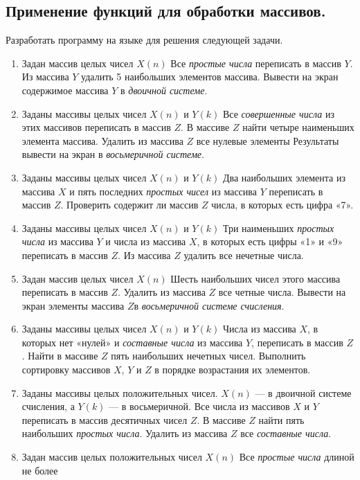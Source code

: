 \subsection[Применение функций для обработки массивов.]{Применение функций для обработки массивов.}
Разработать программу на языке  для решения следующей задачи.

\begin{enumerate}
\item Задан массив целых чисел $X(n)$ Все \emph{простые числа} переписать в массив
$Y$. Из массива $Y$ удалить 5 наибольших элементов массива. Вывести на экран содержимое массива
$Y$ в \emph{двоичной системе}.
\item Заданы массивы целых чисел $X(n)$ и $Y(k)$ Все
\emph{совершенные числа} из этих массивов переписать в массив $Z$. В массиве
$Z$ найти четыре наименьших элемента массива. Удалить из массива $Z$ все нулевые
элементы Результаты вывести на экран в \emph{восьмеричной системе}. 
\item Заданы массивы целых чисел $X(n)$ и $Y(k)$ Два наибольших
элемента из массива $X$ и пять последних \emph{простых чисел} из массива
$Y$ переписать в массив $Z$. Проверить содержит ли массив $Z$ числа, в
которых есть цифра «7».
\item Заданы массивы целых чисел $X(n)$ и $Y(k)$ Три наименьших
\emph{простых числа} из массива $Y$ и числа из массива $X$, в которых есть цифры «1»
и «9» переписать в массив $Z$. Из  массива $Z$ удалить все нечетные числа.
\item Задан массив целых чисел $X(n)$ Шесть наибольших чисел этого массива переписать в массив
$Z$. Удалить из массива $Z$ все четные числа. Вывести на экран элементы массива
$Z$$ $в \emph{восьмеричной системе счисления}.
\item Заданы массивы целых чисел $X(n)$ и $Y(k)$ Числа из массива
$X$, в которых нет «нулей» и \emph{составные числа} из массива $Y$, переписать в массив
$Z$. Найти в массиве $Z$ пять наибольших нечетных чисел. Выполнить сортировку массивов $X$,
$Y$ и $Z$ в порядке возрастания их элементов.
\item Заданы массивы целых положительных чисел. $X(n)$ --- в двоичной системе счисления, а 
$Y(k)$ --- в восьмеричной. Все числа из массивов $X$ и $Y$
переписать в массив десятичных чисел $Z$. В массиве $Z$ найти пять наибольших
\emph{простых числа}. Удалить из массива $Z$ все \emph{составные числа}.
\item Задан массив целых положительных чисел $X(n)$ Все \emph{простые числа} длиной не более
$$
\end{enumerate}
